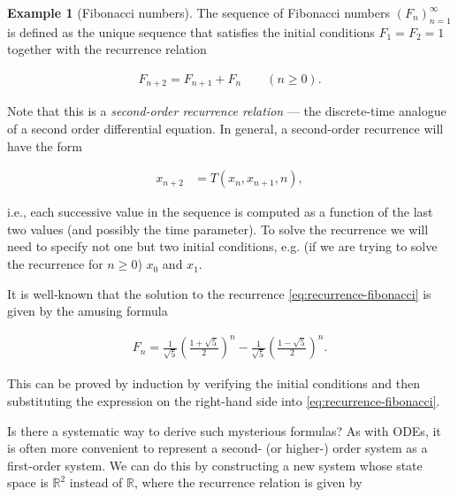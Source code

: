 \documentclass[11pt]{report}
\theoremstyle{plain}
\theoremstyle{definition}
\newtheorem{example}[thm]{Example}
\begin{document}
\begin{example}[Fibonacci numbers]
The sequence of Fibonacci numbers $(F_n)_{n=1}^\infty$
is defined as the unique sequence that satisfies the
initial conditions $F_1=F_2=1$ together with the
recurrence relation

\begin{equation*} \tag{31}\label{eq:recurrence-fibonacci}
\begin{split}
F_{n+2}=F_{n+1}+F_n \qquad (n\ge0).
\end{split}
\end{equation*}

\noindent Note that this is a \emph{second-order recurrence relation}
--- the discrete-time analogue of a second order
differential equation. In general, a second-order
recurrence will have the form

\begin{align*}
x_{n+2} &= T(x_n,x_{n+1},n),
\end{align*}

\noindent i.e., each successive value in the sequence is
computed as a function of the last two values (and
possibly the time parameter). To solve the recurrence
we will need to specify not one but two initial
conditions, e.g. (if we are trying to solve the
recurrence for $n\ge0$) $x_0$ and $x_1$.

It is well-known that the solution to the recurrence
\eqref{eq:recurrence-fibonacci} is given by the amusing
formula

\begin{equation*} \tag{32}\label{eq:fibonacci-closedform}
\begin{split}
F_n = \frac{1}{\sqrt{5}}\left(\frac{1+\sqrt{5}}{2}\right)^n-\frac{1}{\sqrt{5}}\left(\frac{1-\sqrt{5}}{2}\right)^n.
\end{split}
\end{equation*}

\noindent This can be proved by induction by verifying the
initial conditions and then substituting the
expression on the right-hand side into
\eqref{eq:recurrence-fibonacci}.

Is there a systematic way to derive such mysterious
formulas? As with ODEs, it is often more convenient to
represent a second- (or higher-) order system as a
first-order system. We can do this by constructing a
new system whose state space is $\mathbb{R}^2$ instead
of $\mathbb{R}$, where the recurrence relation is
given by


\end{example}
\end{document}
